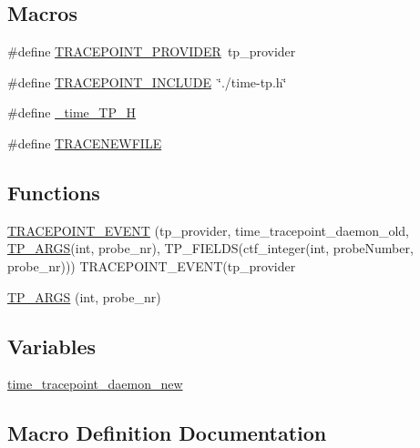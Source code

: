 \subsection*{Macros}
\begin{DoxyCompactItemize}
\item 
\#define \hyperlink{time-tp_8h_a6751837690af3a0ad19fb209a69dd16e}{T\+R\+A\+C\+E\+P\+O\+I\+N\+T\+\_\+\+P\+R\+O\+V\+I\+D\+ER}~tp\+\_\+provider
\item 
\#define \hyperlink{time-tp_8h_a090261faa16d05fb6993d61861ba8ff9}{T\+R\+A\+C\+E\+P\+O\+I\+N\+T\+\_\+\+I\+N\+C\+L\+U\+DE}~\char`\"{}./time-\/tp.\+h\char`\"{}
\item 
\#define \hyperlink{time-tp_8h_ad91ef7d5cc408393bcfaf376512d4ce7}{\+\_\+time\+\_\+\+T\+P\+\_\+H}
\item 
\#define \hyperlink{time-tp_8h_add263661f496a52d5c70c5894a0a5450}{T\+R\+A\+C\+E\+N\+E\+W\+F\+I\+LE}
\end{DoxyCompactItemize}
\subsection*{Functions}
\begin{DoxyCompactItemize}
\item 
\hyperlink{time-tp_8h_af0206ac697262b1e5d49501a4237b4f7}{T\+R\+A\+C\+E\+P\+O\+I\+N\+T\+\_\+\+E\+V\+E\+NT} (tp\+\_\+provider, time\+\_\+tracepoint\+\_\+daemon\+\_\+old, \hyperlink{time-tp_8h_a94a7a81b68dcdbeece169da86213a640}{T\+P\+\_\+\+A\+R\+GS}(int, probe\+\_\+nr), T\+P\+\_\+\+F\+I\+E\+L\+DS(ctf\+\_\+integer(int, probe\+Number, probe\+\_\+nr))) T\+R\+A\+C\+E\+P\+O\+I\+N\+T\+\_\+\+E\+V\+E\+NT(tp\+\_\+provider
\item 
\hyperlink{time-tp_8h_a94a7a81b68dcdbeece169da86213a640}{T\+P\+\_\+\+A\+R\+GS} (int, probe\+\_\+nr)
\end{DoxyCompactItemize}
\subsection*{Variables}
\begin{DoxyCompactItemize}
\item 
\hyperlink{time-tp_8h_ada75c5ad2fc628e459825c5e98f1d982}{time\+\_\+tracepoint\+\_\+daemon\+\_\+new}
\end{DoxyCompactItemize}


\subsection{Macro Definition Documentation}
\mbox{\label{time-tp_8h_ad91ef7d5cc408393bcfaf376512d4ce7}} 
